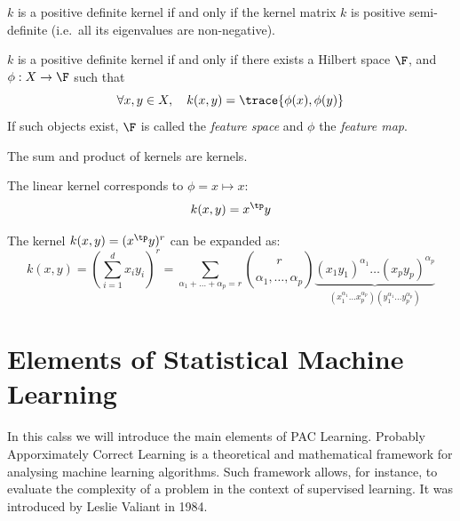 \documentclass[toc, titlepaged]{../cs-classes/cs-classes}
\begin{document}
\begin{property}
    $k$ is a positive definite kernel if and only if the kernel matrix $k$ is positive semi-definite (i.e.~all its eigenvalues are non-negative).
\end{property}

\begin{theorem}[Aronsazjn]
    $k$ is a positive definite kernel if and only if there exists a Hilbert space $\F$, and $\phi:X\to\F$ such that
    \begin{equation*}
        \forall x, y\in X, \quad k(x, y) = \trace{\phi(x), \phi(y)}
    \end{equation*}
    If such objects exist, $\F$ is called the \emph{feature space} and $\phi$ the \emph{feature map}.
\end{theorem}

\begin{property}
    The sum and product of kernels are kernels.
\end{property}

\begin{example}
    The linear kernel corresponds to $\phi = x \mapsto x$:
    \begin{equation*}
        k(x, y) = x^\tp y
    \end{equation*}
\end{example}

\begin{example}
    The kernel $k(x, y) = (x^\tp y)^r$ can be expanded as:
    \begin{equation*}
        k(x, y) = \left(\sum_{i=1}^d x_iy_i\right)^r = \sum_{\alpha_1 + \dots + \alpha_p=r} \binom{r}{\alpha_1, \dots, \alpha_p} \underbrace{(x_1y_1)^{\alpha_1} \dots (x_py_p)^{\alpha_p}}_{(x_1^{\alpha_1}\dots x_p^{\alpha_p})(y_1^{\alpha_1}\dots y_p^{\alpha_p})}
    \end{equation*}
\end{example}

\begin{example}
\end{example}

\begin{example}
\end{example}

\section{Elements of Statistical Machine Learning}
In this calss we will introduce the main elements of PAC Learning. Probably Apporximately Correct Learning is a theoretical and mathematical framework for analysing machine learning algorithms. Such framework allows, for instance, to evaluate the complexity of a problem in the context of supervised learning. It was introduced by Leslie Valiant in 1984.
\end{document}
